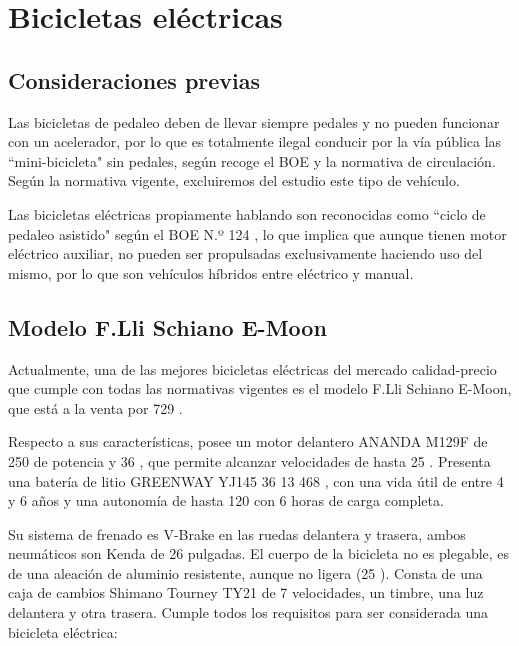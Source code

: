 \newpage
\section{Bicicletas eléctricas}
\label{bicicleta_electrica}

\subsection{Consideraciones previas}

Las bicicletas de pedaleo deben de llevar siempre pedales y no pueden funcionar con un acelerador, por lo que es totalmente ilegal conducir por la vía pública las ``mini-bicicleta" sin pedales, según recoge el BOE y la normativa de circulación. Según la normativa vigente, excluiremos del estudio este tipo de vehículo. 

Las bicicletas eléctricas propiamente hablando son reconocidas como ``ciclo de pedaleo asistido" según el BOE N.º 124 \cite{boe124}, lo que implica que aunque tienen motor eléctrico auxiliar, no pueden ser propulsadas exclusivamente haciendo uso del mismo, por lo que son vehículos híbridos entre eléctrico y manual.

\subsection{Modelo F.Lli Schiano E-Moon}

Actualmente, una de las mejores bicicletas eléctricas del mercado calidad-precio que cumple con todas las normativas vigentes es el modelo F.Lli Schiano E-Moon, que está a la venta por 729 . 

Respecto a sus características, posee un motor delantero ANANDA M129F de 250  de potencia y 36 , que permite alcanzar velocidades de hasta 25 . Presenta una batería de litio GREENWAY YJ145 36  13  468 , con una vida útil de entre 4 y 6 años y una autonomía de hasta 120  con 6 horas de carga completa. 

Su sistema de frenado es V-Brake en las ruedas delantera y trasera, ambos neumáticos son Kenda de 26 pulgadas. El cuerpo de la bicicleta no es plegable, es de una aleación de aluminio resistente, aunque no ligera (25 ). Consta de una caja de cambios Shimano Tourney TY21 de 7 velocidades, un timbre, una luz delantera y otra trasera. 
Cumple todos los requisitos para ser considerada una bicicleta eléctrica:

